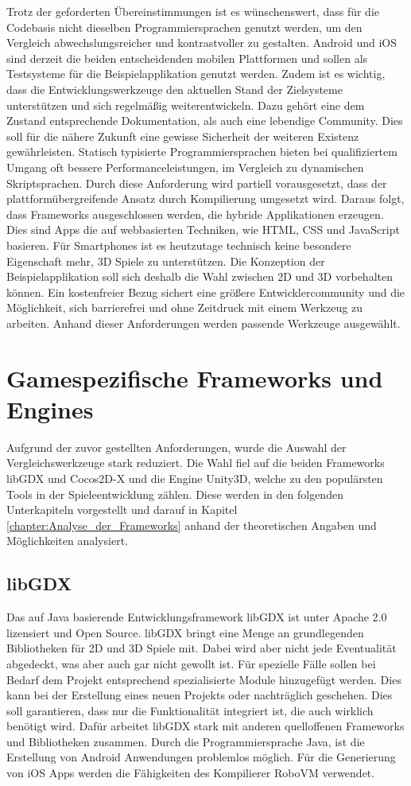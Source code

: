 Trotz der geforderten Übereinstimmungen ist es wünschenswert, dass für die Codebasis nicht dieselben Programmiersprachen genutzt werden, um den Vergleich abwechslungsreicher und kontrastvoller zu gestalten. Android und iOS sind derzeit die beiden entscheidenden mobilen Plattformen und sollen als Testsysteme für die Beispielapplikation genutzt werden. Zudem ist es wichtig, dass die Entwicklungswerkzeuge den aktuellen Stand der Zielsysteme unterstützen und sich regelmäßig weiterentwickeln. Dazu gehört eine dem Zustand entsprechende Dokumentation, als auch eine lebendige Community. Dies soll für die nähere Zukunft eine gewisse Sicherheit der weiteren Existenz gewährleisten. Statisch typisierte Programmiersprachen bieten bei qualifiziertem Umgang oft bessere Performanceleistungen, im Vergleich zu dynamischen Skriptsprachen. Durch diese Anforderung wird partiell vorausgesetzt, dass der plattformübergreifende Ansatz durch Kompilierung umgesetzt wird. Daraus folgt, dass Frameworks ausgeschlossen werden, die hybride Applikationen erzeugen. Dies sind Apps die auf webbasierten Techniken, wie HTML, CSS und JavaScript basieren. Für Smartphones ist es heutzutage technisch keine besondere Eigenschaft mehr, 3D Spiele zu unterstützen. Die Konzeption der Beispielapplikation soll sich deshalb die Wahl zwischen 2D und 3D vorbehalten können. Ein kostenfreier Bezug sichert eine größere Entwicklercommunity und die Möglichkeit, sich barrierefrei und ohne Zeitdruck mit einem Werkzeug zu arbeiten. Anhand dieser Anforderungen werden passende Werkzeuge ausgewählt.

\section{Gamespezifische Frameworks und Engines}
Aufgrund der zuvor gestellten Anforderungen, wurde die Auswahl der Vergleichswerkzeuge stark reduziert. Die Wahl fiel auf die beiden Frameworks libGDX und Cocos2D-X und die Engine Unity3D, welche zu den populärsten Tools in der Spieleentwicklung zählen. Diese werden in den folgenden Unterkapiteln vorgestellt und darauf in Kapitel \ref{chapter:Analyse_der_Frameworks} anhand der theoretischen Angaben und Möglichkeiten analysiert.

\subsection{libGDX}
Das auf Java basierende Entwicklungsframework libGDX ist unter Apache 2.0 lizensiert und Open Source. libGDX bringt eine Menge an grundlegenden Bibliotheken für 2D und 3D Spiele mit. Dabei wird aber nicht jede Eventualität abgedeckt, was aber auch gar nicht gewollt ist. Für spezielle Fälle sollen bei Bedarf dem Projekt entsprechend spezialisierte Module hinzugefügt werden. Dies kann bei der Erstellung eines neuen Projekts oder nachträglich geschehen. Dies soll garantieren, dass nur die Funktionalität integriert ist, die auch wirklich benötigt wird. Dafür arbeitet libGDX stark mit anderen quelloffenen Frameworks und Bibliotheken zusammen. Durch die Programmiersprache Java, ist die Erstellung von Android Anwendungen problemlos möglich. Für die Generierung von iOS Apps werden die Fähigkeiten des Kompilierer RoboVM verwendet. \citep{libGDX_main_features}


